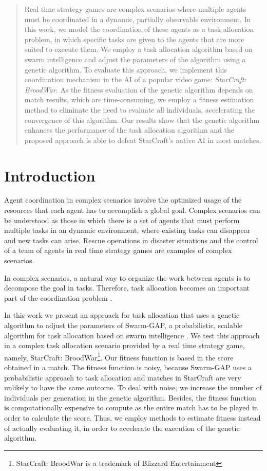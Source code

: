 \documentclass[a4paper]{sbgames}
\begin{document}
\begin{abstract}
Real time strategy games are complex scenarios where multiple agents must be coordinated in a dynamic, partially observable environment. In this work, we model the coordination of these agents as a task allocation problem, in which specific tasks are given to the agents that are more suited to execute them. We employ a task allocation algorithm based on swarm intelligence and adjust the parameters of the algorithm using a genetic algorithm. To evaluate this approach, we implement this coordination mechanism in the AI of a popular video game: {\em StarCraft: BroodWar}. As the fitness evaluation of the genetic algorithm depends on match results, which are time-consuming, we employ a fitness estimation method to eliminate the need to evaluate all individuals, accelerating the convergence of this algorithm. Our results show that the genetic algorithm enhances the performance of the task allocation algorithm and the proposed approach is able to defeat StarCraft's native AI in most matches.
\end{abstract}





\section{Introduction}
\label{sec:intro}
Agent coordination in complex scenarios involve the optimized usage of the resources that each agent has to accomplish a global goal. Complex scenarios can be understood as those in which there is a set of agents that must perform multiple tasks in an dynamic environment, where existing tasks can disappear and new tasks can arise. Rescue operations in disaster situations \cite{Kitano2000} and the control of a team of agents in real time strategy games \cite{Weber+2011} are examples of complex scenarios.

In complex scenarios, a natural way to organize the work between agents is to decompose the goal in tasks. Therefore, task allocation becomes an important part of the coordination problem \cite{Ferreira+2008ccmms}. 

In this work we present an approach for task allocation that uses a genetic algorithm to adjust the parameters of Swarm-GAP, a probabilistic, scalable algorithm for task allocation based on swarm intelligence \cite{Ferreira+2008ccmms}. We test this approach in a complex task allocation scenario provided by a real time strategy game, namely, StarCraft: BroodWar\footnote{StarCraft: BroodWar is a trademark of Blizzard Entertainment}. Our fitness function is based in the score obtained in a match. The fitness function is noisy, because Swarm-GAP uses a probabilistic approach to task allocation and matches in StarCraft are very unlikely to have the same outcome. To deal with noise, we increase the number of individuals per generation in the genetic algorithm. Besides, the fitness function is computationally expensive to compute as the entire match has to be played in order to calculate the score. Thus, we employ methods to estimate fitness instead of actually evaluating it, in order to accelerate the execution of the genetic algorithm. 
\end{document}
